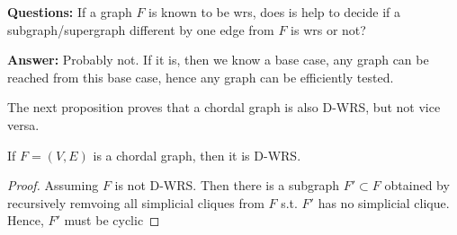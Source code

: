 \textbf{Questions:} If a graph $F$ is known to be wrs, does is help to decide if a subgraph/supergraph different by one edge from $F$ is wrs or not?

\textbf{Answer:} Probably not. If it is, then we know a base case, any graph can be reached from this base case, hence any graph can be efficiently tested. 

\iffalse
The undirected edge connects two parents of a common child is called a \textit{moralized edge}. The process of obtaining a moral graph from a DAG is called \textit{moralization}. There is a unique moral graph of each DAG. Next, we define the reverse of a moralization process as \textit{demoralization}. It is defined on undirected graphs with at least one simplicial node. 
\fi

\iffalse
The next proposition proves that a chordal graph is also D-WRS, but not vice versa. 
\begin{proposition}
\label{prop:chordal_is_dwrs}
If $F=(V,E)$ is a chordal graph, then it is D-WRS. 
\end{proposition}
\begin{proof}
Assuming $F$ is not D-WRS. Then there is a subgraph $F' \subset F$ obtained by recursively remvoing all simplicial cliques from $F$ s.t. $F'$ has no simplicial clique. Hence, $F'$ must be cyclic 
\end{proof}


